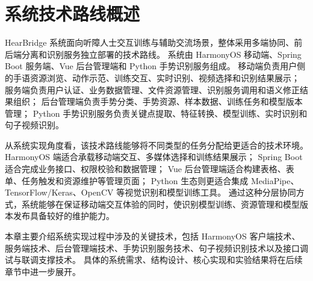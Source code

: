 
\section{系统技术路线概述}

HearBridge 系统面向听障人士交互训练与辅助交流场景，整体采用多端协同、前后端分离和识别服务独立部署的技术路线。
系统由 HarmonyOS 移动端、Spring Boot 服务端、Vue 后台管理端和 Python 手势识别服务组成。
移动端负责用户侧的手语资源浏览、动作示范、训练交互、实时识别、视频选择和识别结果展示；
服务端负责用户认证、业务数据管理、文件资源管理、识别服务调用和语义修正结果组织；
后台管理端负责手势分类、手势资源、样本数据、训练任务和模型版本管理；
Python 手势识别服务负责关键点提取、特征转换、模型训练、实时识别和句子视频识别。

从系统实现角度看，该技术路线能够将不同类型的任务分配给更适合的技术环境。
HarmonyOS 端适合承载移动端交互、多媒体选择和训练结果展示；
Spring Boot 适合完成业务接口、权限校验和数据管理；
Vue 后台管理端适合构建表格、表单、任务触发和资源维护等管理页面；
Python 生态则更适合集成 MediaPipe、TensorFlow/Keras、OpenCV 等视觉识别和模型训练工具。
通过这种分层协同方式，系统能够在保证移动端交互体验的同时，使识别模型训练、资源管理和模型版本发布具备较好的维护能力。

本章主要介绍系统实现过程中涉及的关键技术，包括 HarmonyOS 客户端技术、服务端技术、后台管理端技术、手势识别服务技术、句子视频识别技术以及接口调试与联调支撑技术。
具体的系统需求、结构设计、核心实现和实验结果将在后续章节中进一步展开。
